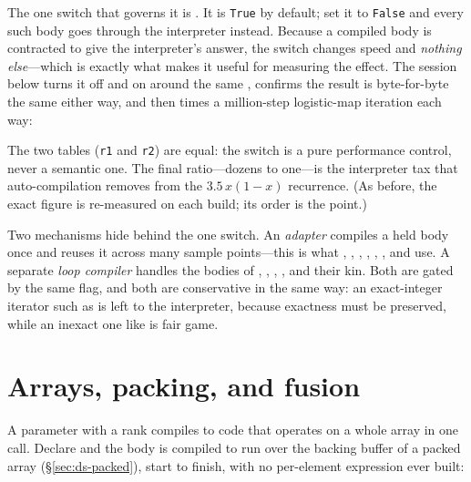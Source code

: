 The one switch that governs it is .
It is \texttt{True} by default; set it to \texttt{False} and every such body goes
through the interpreter instead. Because a compiled body is contracted to give the
interpreter's answer, the switch changes speed and \emph{nothing else}---which is
exactly what makes it useful for measuring the effect. The session below turns it
off and on around the same , confirms the result is byte-for-byte the
same either way, and then times a million-step logistic-map iteration each way:


\noindent The two tables (\texttt{r1} and \texttt{r2}) are equal: the switch is a
pure performance control, never a semantic one. The final ratio---dozens to
one---is the interpreter tax that auto-compilation removes from the
\(3.5\,x(1-x)\) recurrence. (As before, the exact figure is re-measured on each
build; its order is the point.)

Two mechanisms hide behind the one switch. An \emph{adapter} compiles a held body
once and reuses it across many sample points---this is what , ,
, , , ,  and  use.
A separate \emph{loop compiler} handles the bodies of , ,
, ,  and their kin. Both are gated by the same
 flag, and both are conservative in the same way: an
exact-integer  iterator such as  is left to the
interpreter, because exactness must be preserved, while an inexact one like
 is fair game.


\section{Arrays, packing, and fusion}
\label{sec:compile-arrays}

A parameter with a rank compiles to code that operates on a whole array in one
call. Declare  and the body is compiled to run over the
backing buffer of a packed array (\S\ref{sec:ds-packed}), start to finish, with no
per-element expression ever built:

